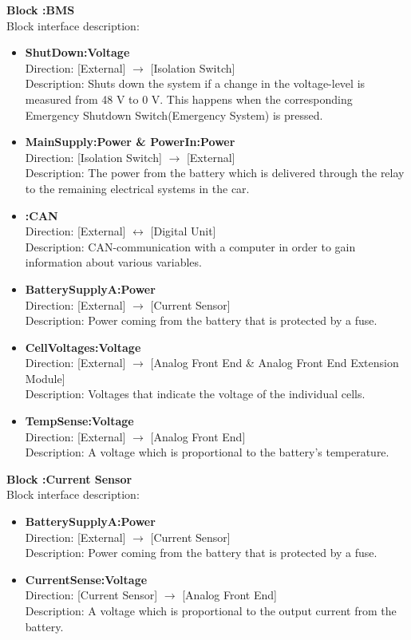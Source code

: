 \textbf{Block :BMS}\\
Block interface description:
\begin{itemize}
	\item \textbf{ShutDown:Voltage}\\
	Direction: [External] $\rightarrow$ [Isolation Switch]\\
	Description: Shuts down the system if a change in the voltage-level is measured from 48 V to 0 V. This happens when the corresponding Emergency Shutdown Switch(Emergency System) is pressed.
	\item \textbf{MainSupply:Power \& PowerIn:Power}\\
	Direction: [Isolation Switch] $\rightarrow$ [External]\\
	Description: The power from the battery which is delivered through the relay to the remaining electrical systems in the car. 
	\item \textbf{:CAN}\\
	Direction: [External] $\leftrightarrow$ [Digital Unit]\\
	Description: CAN-communication with a computer in order to gain information about various variables.
	\item \textbf{BatterySupplyA:Power}\\
	Direction: [External] $\rightarrow$ [Current Sensor]\\
	Description: Power coming from the battery that is protected by a fuse.
	\item \textbf{CellVoltages:Voltage}\\
	Direction: [External] $\rightarrow$ [Analog Front End \& Analog Front End Extension Module]\\
	Description: Voltages that indicate the voltage of the individual cells.
	\item \textbf{TempSense:Voltage}\\
	Direction: [External] $\rightarrow$ [Analog Front End]\\
	Description: A voltage which is proportional to the battery's temperature.
\end{itemize}

\textbf{Block :Current Sensor}\\
Block interface description:
\begin{itemize}
	\item \textbf{BatterySupplyA:Power}\\
	Direction: [External] $\rightarrow$ [Current Sensor]\\
	Description: Power coming from the battery that is protected by a fuse.
	\item \textbf{CurrentSense:Voltage}\\
	Direction: [Current Sensor] $\rightarrow$ [Analog Front End]\\
	Description: A voltage which is proportional to the output current from the battery.
\end{itemize}

